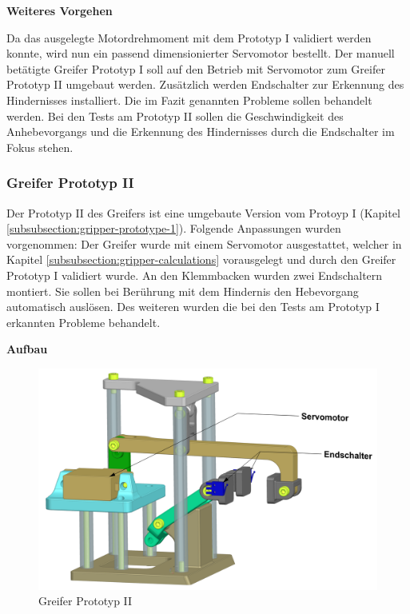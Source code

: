 \textbf{Weiteres Vorgehen}

Da das ausgelegte Motordrehmoment mit dem Prototyp I validiert werden konnte, wird nun ein passend dimensionierter Servomotor bestellt. Der manuell betätigte Greifer Prototyp I soll auf den Betrieb mit Servomotor zum Greifer Prototyp II umgebaut werden. Zusätzlich werden Endschalter zur Erkennung des Hindernisses installiert. Die im Fazit genannten Probleme sollen behandelt werden.
Bei den Tests am Prototyp II sollen die Geschwindigkeit des Anhebevorgangs und die Erkennung des Hindernisses durch die Endschalter im Fokus stehen.


\subsubsection{Greifer Prototyp II}
\label{subsubsection:gripper-prototype-2}

Der Prototyp II des Greifers ist eine umgebaute Version vom Protoyp I (Kapitel \ref{subsubsection:gripper-prototype-1}). Folgende Anpassungen wurden vorgenommen: Der Greifer wurde mit einem Servomotor ausgestattet, welcher in Kapitel \ref{subsubsection:gripper-calculations} vorausgelegt und durch den Greifer Prototyp I validiert wurde. An den Klemmbacken wurden zwei Endschaltern montiert. Sie sollen bei Berührung mit dem Hindernis den Hebevorgang automatisch auslösen. Des weiteren wurden die bei den Tests am Prototyp I erkannten Probleme behandelt.

\textbf{Aufbau}

\begin{figure}[H]
\centering
\includegraphics[width=1.0\textwidth]{assets/greifer-prototyp/Greifer_Prototyp_2_trimetrisch.png}
\caption{Greifer Prototyp II}
\label{fig:gripper-prototype-2-trimetric}
\end{figure}

